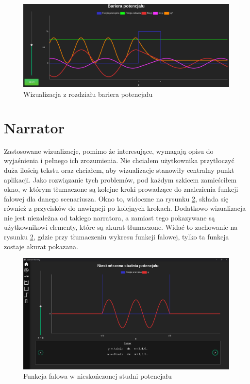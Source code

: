 \documentclass{SGGW-thesis}
\begin{document}
	\begin{figure}[H]
	\includegraphics[width=\textwidth,height=\textheight,keepaspectratio]{barrier.png} 
	\caption{Wizualizacja z rozdziału bariera potencjału}
	\label{fig:potential-barrier}
	\end{figure}
	
	\section{Narrator}
	Zastosowane wizualizacje, pomimo że interesujące, wymagają opisu do wyjaśnienia i pełnego ich zrozumienia. Nie chciałem użytkownika przytłoczyć duża ilością tekstu oraz chciałem, aby wizualizacje stanowiły centralny punkt aplikacji. Jako rozwiązanie tych problemów, pod każdym szkicem zamieściłem okno, w którym tłumaczone są kolejne kroki prowadzące do znalezienia funkcji falowej dla danego scenariusza. Okno to, widoczne na rysunku \ref{fig:narrator}, składa się również z przycisków do nawigacji po kolejnych krokach. Dodatkowo wizualizacja nie jest niezależna od takiego narratora, a zamiast tego pokazywane są użytkownikowi elementy, które są akurat tłumaczone. Widać to zachowanie na rysunku \ref{fig:narrator}, gdzie przy tłumaczeniu wykresu funkcji falowej, tylko ta funkcja zostaje akurat pokazana.
	
	\begin{figure}[H]
	\includegraphics[width=\textwidth,height=\textheight,keepaspectratio]{narrator.png} 
	\caption{Funkcja falowa w nieskończonej studni potencjału}
	\label{fig:narrator}
	\end{figure}
	
\end{document}
